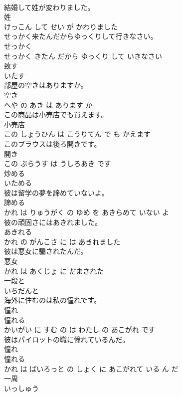 \documentclass[8pt]{extreport}
\begin{document}
\begin{CJK}{UTF8}{min}
\\	結婚して姓が変わりました。	
\\	姓 
\\	けっこん して せい が かわりました			
\\	せっかく来たんだからゆっくりして行きなさい。	
\\	せっかく 
\\	せっかく きたん だから ゆっくり して いきなさい			
\\	致す	
\\	いたす		
\\	部屋の空きはありますか。	
\\	空き 
\\	へや の あき は あります か			
\\	この商品は小売店でも買えます。	
\\	小売店 
\\	この しょうひん は こうりてん で も かえます			
\\	このブラウスは後ろ開きです。	
\\	開き 
\\	この ぶらうす は うしろあき です			
\\	炒める	
\\	いためる		
\\	彼は留学の夢を諦めていないよ。	
\\	諦める 
\\	かれ は りゅうがく の ゆめ を あきらめて いない よ			
\\	彼の頑固さにはあきれました。	
\\	あきれる 
\\	かれ の がんこさ に は あきれました			
\\	彼は悪女に騙されたんだ。	
\\	悪女 
\\	かれ は あくじょ に だまされた			
\\	一段と	
\\	いちだんと		
\\	海外に住むのは私の憧れです。	
\\	憧れ 
\\	憧れる 
\\	かいがい に すむ の は わたし の あこがれ です			
\\	彼はパイロットの職に憧れているんだ。	
\\	憧れ 
\\	憧れる 
\\	かれ は ぱいろっと の しょく に あこがれて いる ん だ			
\\	一周	
\\	いっしゅう		

\end{CJK}
\end{document}
